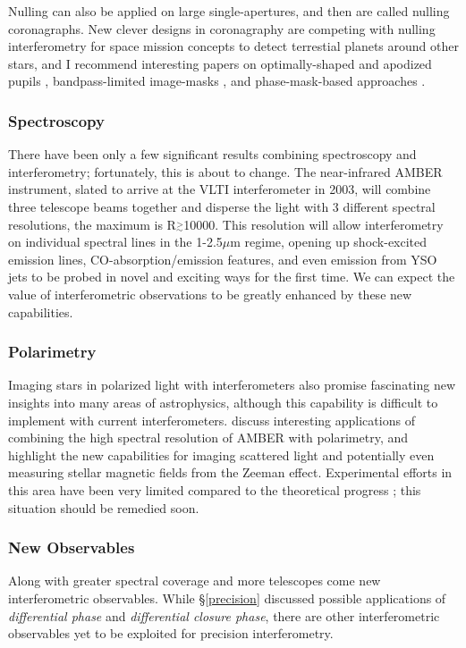 \documentclass[12pt]{article}
\newcommand{\simge}{\mbox{$\stackrel{>}{_{\sim}}$}}
\begin{document}
Nulling can also be applied on large single-apertures, and then are
called nulling coronagraphs.  New clever designs in coronagraphy are
competing with nulling interferometry for space mission concepts to
detect    terrestial planets around other stars, and I recommend
interesting papers on optimally-shaped 
and apodized pupils \citep{spergel2002,papa2001},
bandpass-limited image-masks \citep{kuchner2002}, and phase-mask-based
approaches \citep[e.g.,][]{guyon1999,rouan2000}.

\subsubsection{Spectroscopy}
There have been only a few significant results combining spectroscopy
and interferometry; fortunately, this is about to change.  The
near-infrared AMBER instrument, slated to arrive at the VLTI
interferometer in 2003, will combine three telescope beams together
and disperse the light with 3 different spectral resolutions, the
maximum is R$\simge$10000.  This resolution will allow interferometry
on individual spectral lines in the 1-2.5$\mu$m regime, opening up
shock-excited emission lines, CO-absorption/emission features, and even
emission from YSO jets to be probed in novel and exciting ways for the
first time.  We can expect the value of interferometric observations
to be greatly enhanced by these new capabilities.

\subsubsection{Polarimetry}
Imaging stars in polarized light with interferometers also promise
fascinating new insights into many areas of astrophysics, although
this capability is difficult to implement with current interferometers.
\citet{vakili2002} discuss interesting applications of combining the
high spectral resolution of AMBER with polarimetry, and highlight the
new capabilities for imaging scattered light and potentially even
measuring stellar magnetic fields from the Zeeman effect.
Experimental efforts \citep{RP1997} in this area have been very
limited compared to the theoretical progress
\citep{RP2000}; this situation should be remedied soon.

\subsubsection{New Observables}
Along with greater spectral coverage and more telescopes come new
interferometric observables. While \S\ref{precision} discussed
possible applications of {\em differential phase} and {\em
  differential closure phase}, there are other interferometric
observables yet to be exploited for precision interferometry.
\end{document}
